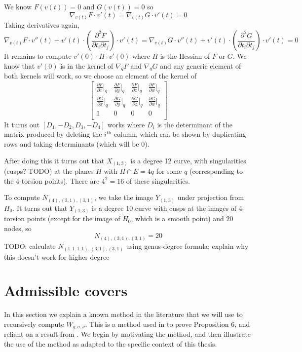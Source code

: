 \documentclass[11pt]{article}           %
\theoremstyle{definition}
\begin{document}
We know
$F(v(t))=0$ and $G(v(t))=0$ so
\[
\nabla _{v(t)}F\cdot v'(t)=\nabla _{v(t)}G\cdot v'(t)=0
\]
Taking derivatives again,
\[
\nabla_{v(t)}F\cdot v''(t)+v'(t)\cdot\left(\frac{\partial^2F}{\partial t_i\partial t_j}\right)\cdot v'(t)=\nabla_{v(t)}G\cdot v''(t)+v'(t)\cdot\left(\frac{\partial^2G}{\partial t_i\partial t_j}\right)\cdot v'(t)=0
\]
It remains to compute $v'(0)\cdot H\cdot v'(0)$ where $H$ is the Hessian of $F$ or $G$.
We know that $v'(0)$ is in the kernel of $\nabla_qF$ and $\nabla_qG$ and any generic element of both kernels will work, so we choose an element of the kernel of
\[
\begin{bmatrix}
  \frac{\partial F}{\partial x}\big|_q & \frac{\partial F}{\partial y}\big|_q & \frac{\partial F}{\partial z}\big|_q & \frac{\partial F}{\partial w}\big|_q \\
  \frac{\partial G}{\partial x}\big|_q & \frac{\partial G}{\partial y}\big|_q & \frac{\partial G}{\partial z}\big|_q & \frac{\partial G}{\partial w}\big|_q \\
  1 & 0 & 0 & 0 \\
  \end{bmatrix}
\]
It turns out $[D_1,-D_2,D_3,-D_4]$ works where $D_i$ is the determinant of the matrix produced by deleting the $i^{\text{th}}$ column, which can be shown by duplicating rows and taking determinants
(which will be 0).

After doing this it turns out that $X_{(1,3)}$ is a degree 12 curve, with singularities (cusps? TODO) at the planes $H$ with $H\cap E=4q$ for some $q$ (corresponding to the 4-torsion points). There are $4^2=16$ of these singularities.

To compute $N_{(4),(3,1),(3,1)}$, we take the image $Y_{(1,3)}$ under projection from $H_0$. It turns out that $Y_{(1,3)}$ is a degree 10
curve with cusps at the images of 4-torsion points (except for the image of $H_0$, which is a smooth point) and $20$ nodes, so
\[
N_{(4),(3,1),(3,1)}=20
\]
TODO: calculate $N_{(1,1,1,1),(3,1),(3,1)}$ using genus-degree formula; explain why this doesn't work for higher degree

\section{Admissible covers}

In this section we explain a known method in the literature that we will use
to recursively compute $W_{g,\sigma,\nu}$. This is a method used in \cite{Generalized} to prove Proposition 6, and reliant on a result from \cite{Lian}. We begin by motivating the method, and then illustrate the use of the method as adapted to the specific context of this thesis.
\end{document}
